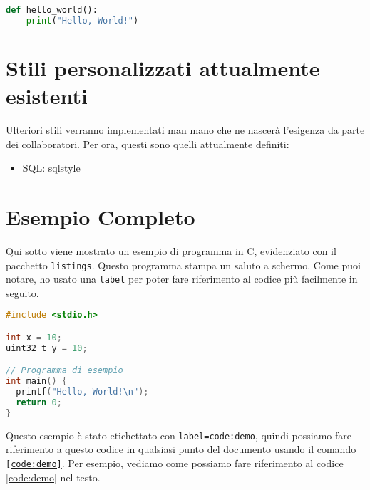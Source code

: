 
\begin{lstlisting}[language=Python]
	def hello_world():
	print("Hello, World!")
\end{lstlisting}

\section{Stili personalizzati attualmente esistenti}
Ulteriori stili verranno implementati man mano che ne nascerà l'esigenza da parte dei collaboratori. Per ora, questi sono quelli attualmente definiti:
\begin{itemize}
	\item SQL: sqlstyle
\end{itemize}

\section{Esempio Completo}

Qui sotto viene mostrato un esempio di programma in C, evidenziato con il pacchetto \texttt{listings}. Questo programma stampa un saluto a schermo. Come puoi notare, ho usato una \texttt{label} per poter fare riferimento al codice più facilmente in seguito.

\begin{lstlisting}[language=C, style=hkn, caption={Demo}, label=code:demo]
#include <stdio.h>

int x = 10;
uint32_t y = 10;

// Programma di esempio
int main() {
  printf("Hello, World!\n");
  return 0;
}
\end{lstlisting}

Questo esempio è stato etichettato con \texttt{label=code:demo}, quindi possiamo fare riferimento a questo codice in qualsiasi punto del documento usando il comando \texttt{\ref{code:demo}}. Per esempio, vediamo come possiamo fare riferimento al codice \ref{code:demo} nel testo.
